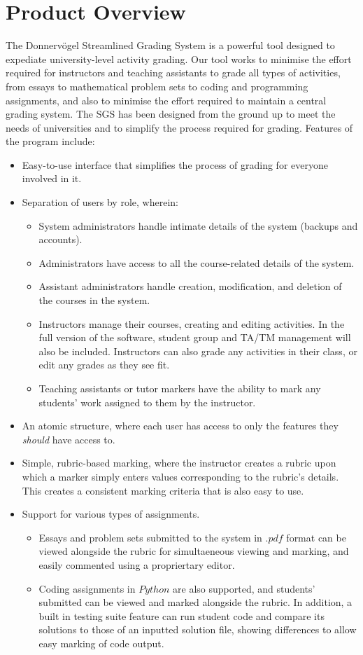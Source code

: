 \documentclass{article}
\begin{document}
\section{Product Overview}  %
The Donnervögel Streamlined Grading System is a powerful tool designed to 
expediate university-level activity grading. Our tool works to minimise the effort 
required for instructors and teaching assistants to grade all types of activities, 
from essays to mathematical problem sets to coding and programming assignments,
and also to minimise the effort required to maintain a central grading system. The 
SGS has been designed from the ground up to meet the needs of universities and 
to simplify the process required for grading. Features of the program include:
\begin{itemize}
	\item Easy-to-use interface that simplifies the process of grading for everyone involved
		in it.
	\item Separation of users by role, wherein:
	\begin{itemize}
		\item System administrators handle intimate details of the system (backups and
			accounts).
		\item Administrators have access to all the course-related details of the system.
		\item Assistant administrators handle creation, modification, and deletion of the
			courses in the system.
		\item Instructors manage their courses, creating and editing activities. In the full
			version of the software, student group and TA/TM management will also be 
			included. Instructors can also grade any activities in their class, or edit any 
			grades as they see fit.
		\item Teaching assistants or tutor markers have the ability to mark any students'
			work assigned to them by the instructor.
	\end{itemize}
	\item An atomic structure, where each user has access to only the features they 
		\emph{should} have access to.
	\item Simple, rubric-based marking, where the instructor creates a rubric upon which
		a marker simply enters values corresponding to the rubric's details. This creates
		a consistent marking criteria that is also easy to use.
	\item Support for various types of assignments. 
	\begin{itemize}
			\item Essays and problem sets submitted to the system in $.pdf$ format can be 
				viewed alongside the rubric for simultaeneous viewing and marking, and easily 
				commented using a propriertary editor. 
			\item Coding assignments in $Python$ are also supported, and students' submitted
				can be viewed and marked alongside the rubric. In addition, a built in testing
				suite feature can run student code and compare its solutions to those of an
				inputted solution file, showing differences to allow easy marking of code
				output.
	\end{itemize}
\end{itemize}
\end{document}
